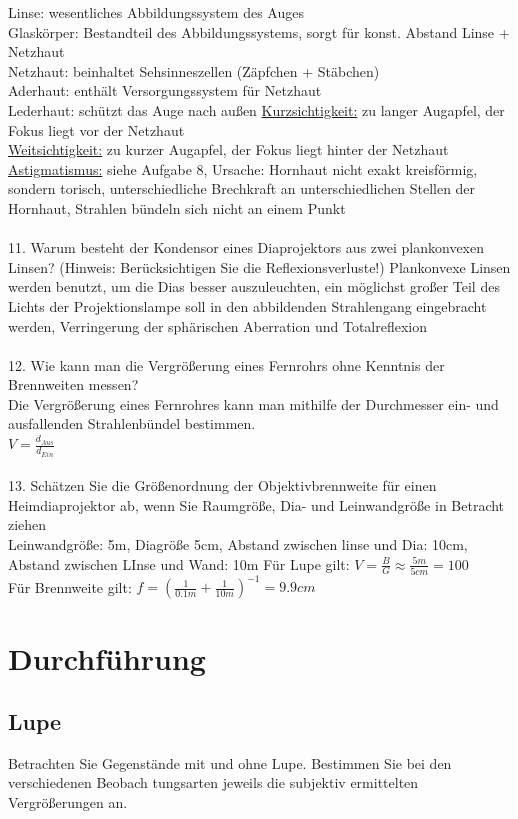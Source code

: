 Linse: wesentliches Abbildungssystem des Auges\\
Glaskörper: Bestandteil des Abbildungssystems, sorgt für konst. Abstand Linse + Netzhaut\\
Netzhaut: beinhaltet Sehsinneszellen (Zäpfchen + Stäbchen)\\
Aderhaut: enthält Versorgungssystem für Netzhaut\\
Lederhaut: schützt das Auge nach außen
\underline{Kurzsichtigkeit:} zu langer Augapfel, der Fokus liegt vor der Netzhaut\\
\underline{Weitsichtigkeit:} zu kurzer Augapfel, der Fokus liegt hinter der Netzhaut\\
\underline{Astigmatismus:} siehe Aufgabe 8, Ursache: Hornhaut nicht exakt kreisförmig, sondern torisch, unterschiedliche Brechkraft an unterschiedlichen Stellen der Hornhaut, Strahlen bündeln sich nicht an einem Punkt
\\\\
11. Warum besteht der Kondensor eines Diaprojektors aus zwei plankonvexen Linsen? (Hinweis:
Berücksichtigen Sie die Reflexionsverluste!)
Plankonvexe Linsen werden benutzt, um die Dias besser auszuleuchten, ein möglichst großer Teil des Lichts der Projektionslampe soll in den abbildenden Strahlengang eingebracht werden, Verringerung der sphärischen Aberration und Totalreflexion\\
\\12. Wie kann man die Vergrößerung eines Fernrohrs ohne Kenntnis der Brennweiten messen?\\
Die Vergrößerung eines Fernrohres kann man mithilfe der Durchmesser ein- und ausfallenden Strahlenbündel bestimmen.\\
$V=\frac{d_{Aus}}{d_{Ein}}$ \\
\\13. Schätzen Sie die Größenordnung der Objektivbrennweite für einen Heimdiaprojektor ab, wenn Sie Raumgröße, Dia- und Leinwandgröße in Betracht ziehen\\
Leinwandgröße: 5m, Diagröße 5cm, Abstand zwischen linse und Dia: 10cm, Abstand zwischen LInse und Wand: 10m
Für Lupe gilt: $V=\frac{B}{G} \approx\frac{5m}{5cm}=100$ \\
Für Brennweite gilt: $f=(\frac{1}{0.1m}+\frac{1}{10m})^{-1}=9.9cm$
\\
\section{Durchführung}
\subsection{Lupe}
Betrachten Sie Gegenstände mit und ohne Lupe. Bestimmen Sie bei den verschiedenen Beobach
tungsarten jeweils die subjektiv ermittelten Vergrößerungen an.
